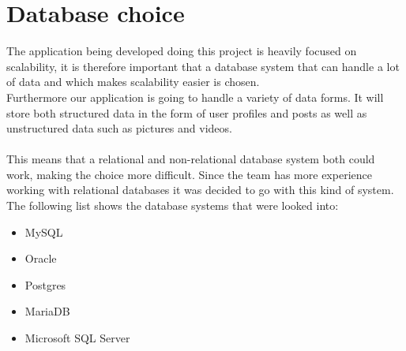 \section{Database choice}
The application being developed doing this project is heavily focused on scalability, it is therefore important that a database system that can handle a lot of data and which makes scalability easier is chosen.
\\
Furthermore our application is going to handle a variety of data forms. It will store both structured data in the form of user profiles and posts as well as unstructured data such as pictures and videos.
\\
\\
This means that a relational and non-relational database system both could work, making the choice more difficult.
Since the team has more experience working with relational databases it was decided to go with this kind of system.
\\
The following list shows the database systems that were looked into:
\begin{itemize}
    \item MySQL
    \item Oracle
    \item Postgres
    \item MariaDB
    \item Microsoft SQL Server  
\end{itemize}


